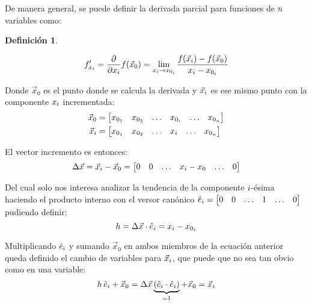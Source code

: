 \documentclass[a5paper,12pt,twoside]{book}
\newtheorem{defn}{{Definición}}[chapter]
\begin{document}
De manera general, se puede definir la derivada parcial para funciones de $n$ variables como:

\begin{mdframed}[style=DefinitionFrame]
    \begin{defn}
    \end{defn}
    \begin{equation*}
        f_{x_i}'
        = \dfrac{\partial}{\partial x_i} f(\Vec{x}_0)
        = \lim_{x_i \to x_{0_i}} \dfrac{f(\Vec{x}_i)-f(\Vec{x}_0)}{x_i-x_{0_i}}
    \end{equation*}
\end{mdframed}

Donde $\Vec{x}_0$ es el punto donde se calcula la derivada y $\Vec{x}_i$ es ese mismo punto con la componente $x_i$ incrementada:
\begin{align*}
    \Vec{x}_0 &= \begin{bmatrix} x_{0_1} & x_{0_2} & \ldots & x_{0_i} & \ldots & x_{0_n} \end{bmatrix}
    \\
    \Vec{x}_i &= \begin{bmatrix} x_{0_1} & x_{0_2} & \ldots & x_i & \ldots & x_{0_n} \end{bmatrix}
\end{align*}

El vector incremento es entonces:
\begin{equation*}
    \Delta \Vec{x} = \Vec{x}_i - \Vec{x}_0 = \begin{bmatrix} 0 & 0 & \ldots & x_i - x_0 & \ldots & 0 \end{bmatrix}
\end{equation*}

Del cual solo nos interesa analizar la tendencia de la componente $i$-ésima haciendo el producto interno con el versor canónico $\hat{e}_i=\begin{bmatrix} 0 & 0 & \ldots & 1 & \ldots & 0 \end{bmatrix}$ pudiendo definir:
\begin{equation*}
    h = \Delta \Vec{x} \cdot \hat{e}_i = x_i - x_{0_i}
\end{equation*}

Multiplicando $\hat{e}_i$ y sumando $\Vec{x}_0$ en ambos miembros de la ecuación anterior queda definido el cambio de variables para $\Vec{x}_i$, que puede que no sea tan obvio como en una variable:
\begin{equation*}
    h \, \hat{e}_i + \Vec{x}_0 = \Delta \Vec{x} \underbrace{\left( \hat{e}_i \cdot \hat{e}_i \right)}_{=1} + \Vec{x}_0 = \Vec{x}_i
\end{equation*}
\end{document}
